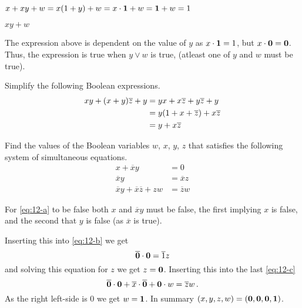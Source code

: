 \documentclass[a4paper, english, 12pt]{article} %
\begin{document}
\begin{subproblem}
  $x + xy + w = \ans{x(1+y) + w = x \cdot \1 + w = \1 + w = 1}$
\end{subproblem} 

\begin{subproblem}
  $xy + w$
\end{subproblem} 

\begin{problem}
  The expression above is dependent on the value of $y$ as $x \cdot \textbf{1} = 1$, but
  $x \cdot \textbf{0} = \textbf{0}$. Thus, the expression is true when $y \vee w$ is true,
  (atleast one of $y$ and $w$ must be true).
\end{problem}

\begin{problem}[11]
\begin{subproblem}
  Simplify the following Boolean expressions.
  \begin{align*}
    xy + (x + y)\overline{z} + y
    \ans{& = yx + x\overline{z} + y \overline{z} + y \\} 
    \ans{& = y(1 + x + \overline{z}) + x\overline{z} \\}
    \ans{& = y + x \overline{z}}
  \end{align*}
\end{subproblem}
\end{problem}

\begin{problem}
  Find the values of the Boolean variables $w$, $x$, $y$, $z$ that satisfies the
  following system of simultaneous equations.
  \begin{align}
    x + \overline{x} y & = 0 \label{eq:12-a} \\
    \overline{x} y & = \overline{x} z \label{eq:12-b} \\ 
    \overline{x} y + \overline{x} \overline{z} + z w & = \overline{z} w \label{eq:12-c} 
  \end{align}
\end{problem}

\begin{answer}
  For \cref{eq:12-a} to be false both $x$ and $\overline{x}y$ must be false,
  the first implying $x$ is false, and the second that $y$ is false (as
  $\overline{x}$ is true).

  Inserting this into \cref{eq:12-b} we get
  \begin{equation*}
    \overline{\textbf{0}} \cdot \textbf{0} = \overline{1} z
  \end{equation*}
  and solving this equation for $z$ we get $z = \textbf{0}$. Inserting this into the
  last \cref{eq:12-c}
  \begin{equation*}
    \overline{\textbf{0}} \cdot \textbf{0} + \overline{x} \cdot \overline{\textbf{0}} + \textbf{0} \cdot w = \overline{z} w\,.
  \end{equation*}
  As the right left-side is $0$ we get $w = \textbf{1}$. In summary $(x,y,z,w)=(\textbf{0},\textbf{0},\textbf{0},\textbf{1})$.
\end{answer}
\end{document}

